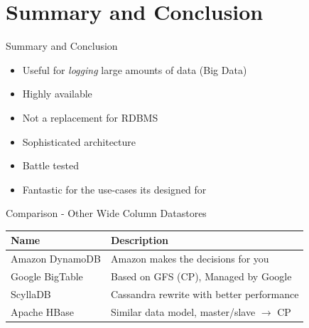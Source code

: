 \documentclass[
  10pt
]{beamer}
\begin{document}
\section{Summary and Conclusion}

\begin{frame}{Summary and Conclusion}
  \begin{itemize}
    \item<+-> Useful for \textit{logging} large amounts of data (Big Data)
    \item<+-> Highly available
    \item<+-> Not a replacement for RDBMS
    \item<+-> Sophisticated architecture
    \item<+-> Battle tested
    \item<+-> Fantastic for the use-cases its designed for
  \end{itemize}
\end{frame}

\appendix

\begin{frame}{Comparison - Other Wide Column Datastores}
  \begin{center}
    \begin{tabular}{l|l}
      Name & Description \\
      \hline
      Amazon DynamoDB & Amazon makes the decisions for you \\
      Google BigTable & Based on GFS (CP), Managed by Google \\
      ScyllaDB & Cassandra rewrite with better performance \\
      Apache HBase & Similar data model, master/slave $\rightarrow$ CP\\
    \end{tabular}
  \end{center}
\end{frame}
\end{document}
